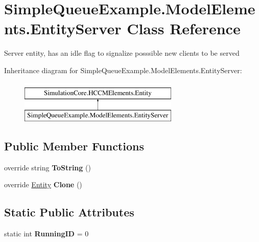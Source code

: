 \hypertarget{class_simple_queue_example_1_1_model_elements_1_1_entity_server}{}\section{Simple\+Queue\+Example.\+Model\+Elements.\+Entity\+Server Class Reference}
\label{class_simple_queue_example_1_1_model_elements_1_1_entity_server}


Server entity, has an idle flag to signalize posssible new clients to be served  


Inheritance diagram for Simple\+Queue\+Example.\+Model\+Elements.\+Entity\+Server\+:\begin{figure}[H]
\begin{center}
\leavevmode
\includegraphics[height=2.000000cm]{class_simple_queue_example_1_1_model_elements_1_1_entity_server}
\end{center}
\end{figure}
\subsection*{Public Member Functions}
\begin{DoxyCompactItemize}
\item 
override string {\bfseries To\+String} ()\hypertarget{class_simple_queue_example_1_1_model_elements_1_1_entity_server_a35dc0fa8afc9780f0979261afcaa1cbd}{}\label{class_simple_queue_example_1_1_model_elements_1_1_entity_server_a35dc0fa8afc9780f0979261afcaa1cbd}

\item 
override \hyperlink{class_simulation_core_1_1_h_c_c_m_elements_1_1_entity}{Entity} {\bfseries Clone} ()\hypertarget{class_simple_queue_example_1_1_model_elements_1_1_entity_server_a6c062109a3309ccc8ee9ffaf17e67bbc}{}\label{class_simple_queue_example_1_1_model_elements_1_1_entity_server_a6c062109a3309ccc8ee9ffaf17e67bbc}

\end{DoxyCompactItemize}
\subsection*{Static Public Attributes}
\begin{DoxyCompactItemize}
\item 
static int {\bfseries Running\+ID} = 0\hypertarget{class_simple_queue_example_1_1_model_elements_1_1_entity_server_af80d7c4688c04db0b4fde24f79448e62}{}\label{class_simple_queue_example_1_1_model_elements_1_1_entity_server_af80d7c4688c04db0b4fde24f79448e62}

\end{DoxyCompactItemize}
